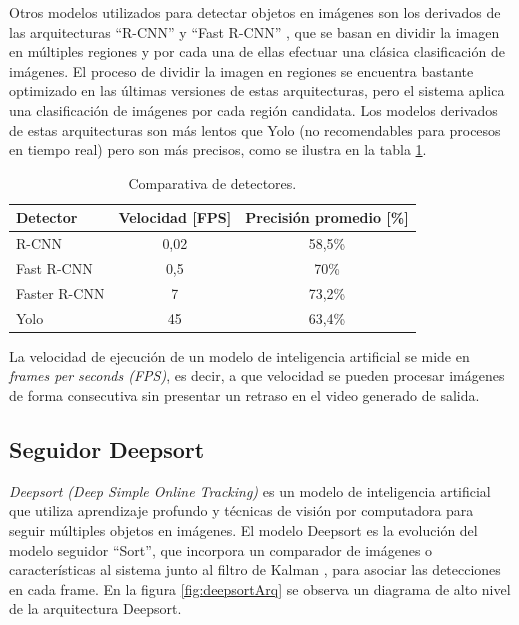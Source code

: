 
\newpage

Otros modelos utilizados para detectar objetos en imágenes son los derivados de las arquitecturas ``R-CNN'' y ``Fast R-CNN'' \citep{RCNN}, que se basan en dividir la imagen en múltiples regiones y por cada una de ellas efectuar una clásica clasificación de imágenes. El proceso de dividir la imagen en regiones se encuentra bastante optimizado en las últimas versiones de estas arquitecturas, pero el sistema aplica una clasificación de imágenes por cada región candidata. Los modelos derivados de estas arquitecturas son más lentos que Yolo (no recomendables para procesos en tiempo real) pero son más precisos, como se ilustra en la tabla \ref{tab:comparativaDetectores}.

\begin{table}[h]
	\centering
	\caption[Comparativa de detectores]{Comparativa de detectores.}
	\begin{tabular}{l c c}    
		\toprule
		\textbf{Detector}   & \textbf{Velocidad [FPS]} & \textbf{Precisión promedio [\%]} \\
		\midrule
		R-CNN & 0,02 & 58,5\% \\
		Fast R-CNN & 0,5 & 70\% \\
		Faster R-CNN & 7 & 73,2\% \\
		Yolo & 45 & 63,4\% \\
		\bottomrule
		\hline
	\end{tabular}
	\label{tab:comparativaDetectores}
\end{table}

La velocidad de ejecución de un modelo de inteligencia artificial se mide en \textit{frames per seconds (FPS)}, es decir, a que velocidad se pueden procesar imágenes de forma consecutiva sin presentar un retraso en el video generado de salida.

\subsection{Seguidor Deepsort}

\textit{Deepsort (Deep Simple Online Tracking)} es un modelo de inteligencia artificial que utiliza aprendizaje profundo y técnicas de visión por computadora para seguir múltiples objetos en imágenes. El modelo Deepsort es la evolución del modelo seguidor ``Sort'', que incorpora un comparador de imágenes o características al sistema junto al filtro de Kalman \citep{KALMAN_FILTER}, para asociar las detecciones en cada frame. En la figura \ref{fig:deepsortArq} se observa un diagrama de alto nivel de la arquitectura Deepsort.

